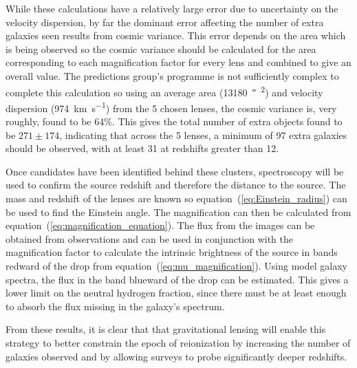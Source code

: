 		While these calculations have a relatively large error due to uncertainty on the velocity dispersion, by far the dominant error affecting the number of extra galaxies seen results from cosmic variance. This error depends on the area which is being observed so the cosmic variance should be calculated for the area corresponding to each magnification factor for every lens and combined to give an overall value. The predictions group’s programme is not sufficiently complex to complete this calculation so using an average area (\SI{13180}{\arcsecond{}^2}) and velocity dispersion (\SI{974}{\kilo\metre\per\second}) from the 5 chosen lenses, the cosmic variance is, very roughly, found to be 64\%. This gives the total number of extra objects found to be $271\pm 174$, indicating that across the 5 lenses, a minimum of 97 extra galaxies should be observed, with at least 31 at redshifts greater than 12.

		Once candidates have been identified behind these clusters, spectroscopy will be used to confirm the source redshift and therefore the distance to the source. The mass and redshift of the lenses are known so equation~(\ref{eq:Einstein_radius}) can be used to find the Einstein angle. The magnification can then be calculated from equation~(\ref{eq:magnification_equation}). The flux from the images can be obtained from observations and can be used in conjunction with the magnification factor to calculate the intrinsic brightness of the source in bands redward of the drop from equation~(\ref{eq:mu_magnification}). Using model galaxy spectra, the flux in the band blueward of the drop can be estimated. This gives a lower limit on the neutral hydrogen fraction, since there must be at least enough to absorb the flux missing in the galaxy’s spectrum\cite{lower_limit_H}.

		From these results, it is clear that that gravitational lensing will enable this strategy to better constrain the epoch of reionization by increasing the number of galaxies observed and by allowing surveys to probe significantly deeper redshifts.
